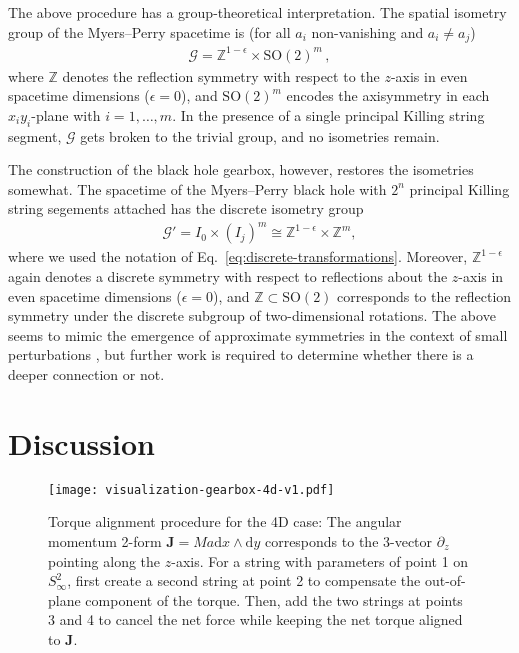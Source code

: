 \documentclass[superscriptaddress,twocolumn,showpacs,
preprintnumbers,amsmath,amssymb,nofootinbib,
longbibliography,aps,prd,10pt]{revtex4-1}
\newcommand{\ts}[1]{{\boldsymbol{#1}}}         %
\newcommand{\dd}{\mbox{d}}
\begin{document}
The above procedure has a group-theoretical interpretation. The spatial isometry group of the Myers--Perry spacetime is (for all $a_i$ non-vanishing and $a_i \not= a_j$)
\begin{align}
\mathcal{G} = \mathbb{Z}^{1-\epsilon} \times \text{SO}(2)^m \, ,
\end{align}
where $\mathbb{Z}$ denotes the reflection symmetry with respect to the $z$-axis in even spacetime dimensions ($\epsilon=0$), and $\text{SO}(2)^m$ encodes the axisymmetry in each $x_iy_i$-plane with $i=1,\dots,m$. In the presence of a single principal Killing string segment, $\mathcal{G}$ gets broken to the trivial group, and no isometries remain.

The construction of the black hole gearbox, however, restores the isometries somewhat. The spacetime of the Myers--Perry black hole with $2^n$ principal Killing string segements attached has the discrete isometry group
\begin{align}
\mathcal{G}' = I_0 \times (I_j)^m \cong \mathbb{Z}^{1-\epsilon} \times \mathbb{Z}^{m} ,
\end{align}
where we used the notation of Eq.~\eqref{eq:discrete-transformations}. Moreover, $\mathbb{Z}^{1-\epsilon}$ again denotes a discrete symmetry with respect to reflections about the $z$-axis in even spacetime dimensions ($\epsilon=0$), and $\mathbb{Z} \subset \text{SO}(2)$ corresponds to the reflection symmetry under the discrete subgroup of two-dimensional rotations. The above seems to mimic the emergence of approximate symmetries in the context of small perturbations \cite{Booth:2003ji,Booth:2006bn}, but further work is required to determine whether there is a deeper connection or not.

\section{Discussion}
\label{sec:conclusions}

\begin{figure}
  \centering
  \texttt{[image: visualization-gearbox-4d-v1.pdf]}
  \caption{Torque alignment procedure for the 4D case: The angular momentum 2-form $\ts{J} = Ma \dd x \wedge \dd y$ corresponds to the 3-vector $\partial_z$ pointing along the $z$-axis. For a string with parameters of point 1 on $S^2_\infty$, first create a second string at point 2 to compensate the out-of-plane component of the torque. Then, add the two strings at points 3 and 4 to cancel the net force while keeping the net torque aligned to $\ts{J}$.}
  \label{fig:gear-box-4d}
\end{figure}
\end{document}

